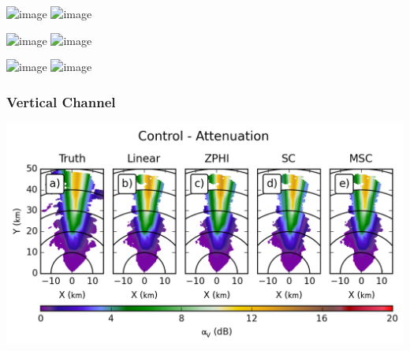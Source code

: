 \documentclass[red]{beamer}
\begin{document}
\begin{frame}
    \begin{center}
        \includegraphics<1>[scale=0.7]{figures/spatial/X_Combined_Differential_Attenuation}
        \includegraphics<2>[scale=0.7]{figures/spatial/X_Control_Differential_Attenuation}
    \end{center}
\end{frame}

\begin{frame}
    \begin{center}
        \includegraphics<1>[scale=0.7]{figures/spatial/X_Combined_Differential_Attenuation_Difference}
        \includegraphics<2>[scale=0.7]{figures/spatial/X_Control_Differential_Attenuation_Difference}
    \end{center}
\end{frame}

\begin{frame}
    \begin{center}
        \includegraphics<1>[scale=0.7]{figures/spatial/X_Combined_Specific_Differential_Attenuation_scatter}
        \includegraphics<2>[scale=0.7]{figures/spatial/X_Control_Specific_Differential_Attenuation_scatter}
    \end{center}
\end{frame}

\subsubsection{Vertical Channel}
\begin{frame}
    \begin{center}
        \includegraphics[scale=0.7]{figures/spatial/C_Control_Attenuation_V}
    \end{center}
\end{frame}
\end{document}
